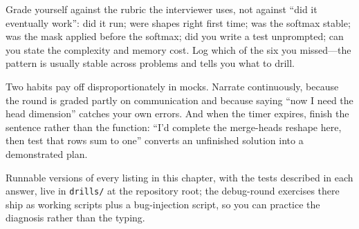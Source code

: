 Grade yourself against the rubric the interviewer uses, not against ``did it eventually work'': did it run; were shapes right first time; was the softmax stable; was the mask applied before the softmax; did you write a test unprompted; can you state the complexity and memory cost. Log which of the six you missed---the pattern is usually stable across problems and tells you what to drill.

Two habits pay off disproportionately in mocks. Narrate continuously, because the round is graded partly on communication and because saying ``now I need the head dimension'' catches your own errors. And when the timer expires, finish the sentence rather than the function: ``I'd complete the merge-heads reshape here, then test that rows sum to one'' converts an unfinished solution into a demonstrated plan.

Runnable versions of every listing in this chapter, with the tests described in each answer, live in \texttt{drills/} at the repository root; the debug-round exercises there ship as working scripts plus a bug-injection script, so you can practice the diagnosis rather than the typing.
